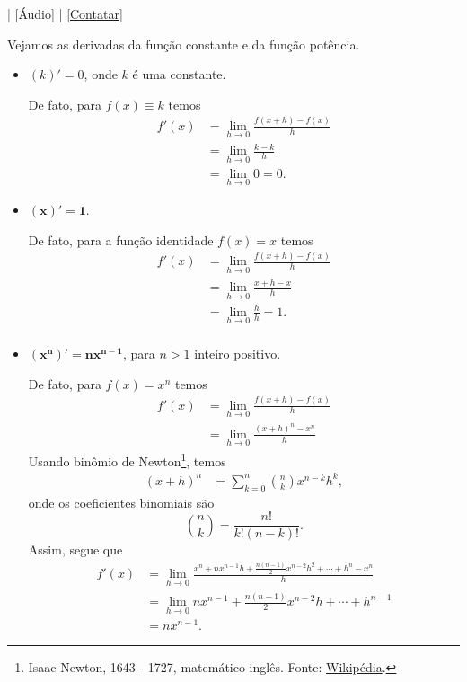 \begin{flushright}
  [Vídeo] | [Áudio] | \href{https://phkonzen.github.io/notas/contato.html}{[Contatar]}
\end{flushright}

Vejamos as derivadas da função constante e da função potência.
\begin{itemize}
\item $(k)' = 0$, onde $k$ é uma constante.

  De fato, para $f(x) \equiv k$ temos
  \begin{align}
    f'(x) &= \lim_{h\to 0} \frac{f(x+h)-f(x)}{h}\\
          &= \lim_{h\to 0} \frac{k-k}{h} \\
          &= \lim_{h\to 0} 0 = 0.
  \end{align}

\item $\pmb{(x)' = 1}$.

  De fato, para a função identidade $f(x) = x$ temos
  \begin{align}
    f'(x) &= \lim_{h\to 0} \frac{f(x+h)-f(x)}{h}\\
          &= \lim_{h\to 0} \frac{x+h-x}{h}\\
          &= \lim_{h\to 0} \frac{h}{h} = 1.\\
  \end{align}

\item $\pmb{(x^n)' = nx^{n-1}}$, para $n > 1$ inteiro positivo.

  De fato, para $f(x) = x^n$ temos
  \begin{align}
    f'(x) &= \lim_{h\to 0} \frac{f(x+h)-f(x)}{h}\\
          &= \lim_{h\to 0} \frac{(x+h)^n-x^n}{h}
  \end{align}
  Usando binômio de Newton\footnote{Isaac Newton, 1643 - 1727, matemático inglês. Fonte: \href{https://pt.wikipedia.org/wiki/Isaac_Newton}{Wikipédia}.}, temos
  \begin{align}
    (x+h)^n &= \sum_{k=0}^n \binom{n}{k}x^{n-k}h^k,
  \end{align}
  onde os coeficientes binomiais são
  \begin{equation}
    \binom{n}{k} = \frac{n!}{k!(n-k)!}.
  \end{equation}
  Assim, segue que
  \begin{align}
    f'(x) &= \lim_{h\to 0} \frac{x^n+nx^{n-1}h+\frac{n(n-1)}{2}x^{n-2}h^2 + \cdots +h^n-x^n}{h}\\
          &= \lim_{h\to 0} nx^{n-1}+\frac{n(n-1)}{2}x^{n-2}h+\cdots+h^{n-1}\\
          &= nx^{n-1}.
  \end{align}
\end{itemize}

